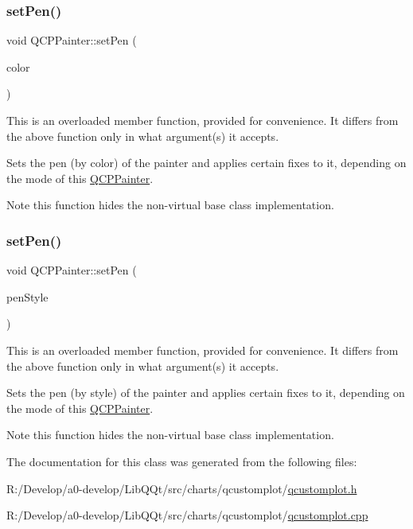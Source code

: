 \subsubsection{\texorpdfstring{set\+Pen()}{setPen()}\hspace{0.1cm}{\footnotesize\ttfamily [2/3]}}
{\footnotesize\ttfamily void Q\+C\+P\+Painter\+::set\+Pen (\begin{DoxyParamCaption}\item[{const Q\+Color \&}]{color }\end{DoxyParamCaption})}

This is an overloaded member function, provided for convenience. It differs from the above function only in what argument(s) it accepts.

Sets the pen (by color) of the painter and applies certain fixes to it, depending on the mode of this \mbox{\hyperlink{class_q_c_p_painter}{Q\+C\+P\+Painter}}.

\begin{DoxyNote}{Note}
this function hides the non-\/virtual base class implementation. 
\end{DoxyNote}
\mbox{\label{class_q_c_p_painter_a25e76095aae41da0d08035060e5f81ca}} 
\subsubsection{\texorpdfstring{set\+Pen()}{setPen()}\hspace{0.1cm}{\footnotesize\ttfamily [3/3]}}
{\footnotesize\ttfamily void Q\+C\+P\+Painter\+::set\+Pen (\begin{DoxyParamCaption}\item[{Qt\+::\+Pen\+Style}]{pen\+Style }\end{DoxyParamCaption})}

This is an overloaded member function, provided for convenience. It differs from the above function only in what argument(s) it accepts.

Sets the pen (by style) of the painter and applies certain fixes to it, depending on the mode of this \mbox{\hyperlink{class_q_c_p_painter}{Q\+C\+P\+Painter}}.

\begin{DoxyNote}{Note}
this function hides the non-\/virtual base class implementation. 
\end{DoxyNote}


The documentation for this class was generated from the following files\+:\begin{DoxyCompactItemize}
\item 
R\+:/\+Develop/a0-\/develop/\+Lib\+Q\+Qt/src/charts/qcustomplot/\mbox{\hyperlink{qcustomplot_8h}{qcustomplot.\+h}}\item 
R\+:/\+Develop/a0-\/develop/\+Lib\+Q\+Qt/src/charts/qcustomplot/\mbox{\hyperlink{qcustomplot_8cpp}{qcustomplot.\+cpp}}\end{DoxyCompactItemize}
